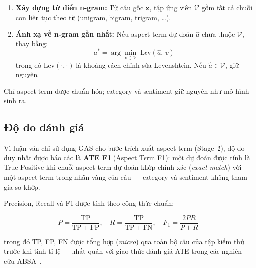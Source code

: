 \begin{enumerate}
  \item \textbf{Xây dựng từ điển n-gram:}  Từ câu gốc $\mathbf{x}$,
    tập ứng viên $\mathcal{V}$ gồm tất cả chuỗi con liên tục theo từ
    (unigram, bigram, trigram, \dots).

  \item \textbf{Ánh xạ về n-gram gần nhất:}  Nếu aspect term dự đoán
    $\hat{a}$ chưa thuộc $\mathcal{V}$, thay bằng:
    \begin{equation}
      a^* = \arg\min_{v \in \mathcal{V}}\;
        \mathrm{Lev}(\hat{a},\, v)
      \label{eq:levenshtein}
    \end{equation}
    \noindent trong đó $\mathrm{Lev}(\cdot, \cdot)$ là khoảng cách
    chỉnh sửa Levenshtein.  Nếu $\hat{a} \in \mathcal{V}$, giữ
    nguyên.
\end{enumerate}

Chỉ aspect term được chuẩn hóa; category và sentiment giữ nguyên
như mô hình sinh ra.

\subsection{Độ đo đánh giá}
\label{subsec:gas_eval}

Vì luận văn chỉ sử dụng GAS cho bước trích xuất aspect term (Stage~2),
độ đo duy nhất được báo cáo là \textbf{ATE F1} (Aspect Term F1):
một dự đoán được tính là True Positive khi chuỗi aspect term dự đoán
khớp chính xác (\textit{exact match}) với một aspect term trong nhãn vàng
của câu — category và sentiment không tham gia so khớp.

Precision, Recall và F1 được tính theo công thức chuẩn:

\begin{equation}
  P = \frac{\mathrm{TP}}{\mathrm{TP} + \mathrm{FP}}, \quad
  R = \frac{\mathrm{TP}}{\mathrm{TP} + \mathrm{FN}}, \quad
  F_1 = \frac{2PR}{P + R}
  \label{eq:prf}
\end{equation}

\noindent trong đó TP, FP, FN được tổng hợp (\textit{micro}) qua toàn
bộ câu của tập kiểm thử trước khi tính tỉ lệ — nhất quán với giao thức
đánh giá ATE trong các nghiên cứu ABSA~\cite{zhang2021gas,luo2019doer}.

